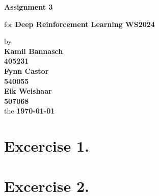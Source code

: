 \documentclass[12pt, a4paper,DIV=12, bibliography=totocnumbered]{scrartcl}
\newcommand{\ASSNR}{3}
\newcommand{\AuthorONE}{Kamil Bannasch}
\newcommand{\MatNoONE}{405231}
\newcommand{\AuthorTWO}{Fynn Castor}
\newcommand{\MatNoTWO}{540055}
\newcommand{\AuthorTHREE}{Eik Weishaar}
\newcommand{\MatNoTHREE}{507068}
\begin{document}
\begin{titlepage}
   \begin{center}
       \vspace*{5cm}

       \textbf{\Huge{Assignment \ASSNR}}

       \vspace{0.5cm}
        for {\large\textbf{Deep Reinforcement Learning WS2024}}
        \vspace{0.75cm}

       by \\
        \textbf{\AuthorONE}\\
        \vspace{0.125cm}
       	\textbf{\MatNoONE}\\ 
       	\vspace{0.25cm}
        \textbf{\AuthorTWO}\\
        \vspace{0.125cm}
       	\textbf{\MatNoTWO}\\ 
       	\vspace{0.25cm}
        \textbf{\AuthorTHREE}\\
        \vspace{0.125cm}
        \textbf{\MatNoTHREE}\\ 
        \vspace{0.25cm}
       the \textbf{\today}

       \vfill
    
    
            
   \end{center}
\end{titlepage}

\section{Excercise 1.}
\section{Excercise 2.}
\end{document}
